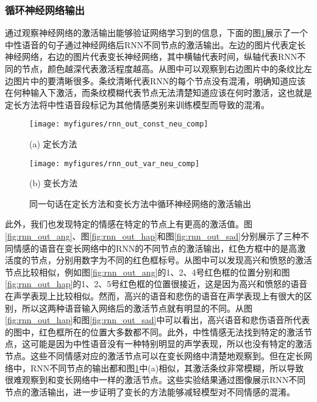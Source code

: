 \subsubsection{循环神经网络输出}
\label{sec:var_len_experiement_rnn}

通过观察神经网络的激活输出能够验证网络学习到的信息，下面的图\ref{fig:rnn_out_comp}展示了一个中性语音的句子通过神经网络后RNN不同节点的激活输出。左边的图片代表定长神经网络，右边的图片代表变长神经网络，其中横轴代表时间，纵轴代表RNN不同的节点，颜色越深代表激活程度越高。从图中可以观察到右边图片中的条纹比左边图片中的要清晰很多。条纹清晰代表RNN的每个节点没有混淆，明确知道应该在何种输入下激活，而条纹模糊代表节点无法清楚知道应该在何时激活，这也就是定长方法将中性语音段标记为其他情感类别来训练模型而导致的混淆。

\begin{figure}[h]
    \vspace{-0cm}  %
    \setlength{\belowcaptionskip}{0cm}   %
    \begin{minipage}{0.48\textwidth}
        \centering
        \texttt{[image: myfigures/rnn\_out\_const\_neu\_comp]}
        \centerline{(a) 定长方法}\medskip
    \end{minipage}\hfill
    \begin{minipage}{0.48\textwidth}
        \centering
        \texttt{[image: myfigures/rnn\_out\_var\_neu\_comp]}
        \centerline{(b) 变长方法}\medskip
    \end{minipage}
    \caption{同一句话在定长方法和变长方法中循环神经网络的激活输出}
    \label{fig:rnn_out_comp}
\end{figure}

此外，我们也发现特定的情感在特定的节点上有更高的激活值。图\ref{fig:rnn_out_ang}、图\ref{fig:rnn_out_hap}和图\ref{fig:rnn_out_sad}分别展示了三种不同情感的语音在变长网络中的RNN的不同节点的激活输出，红色方框中的是高激活度的节点，分别用数字为不同的红色框标号。从图中可以发现高兴和愤怒的激活节点比较相似，例如图\ref{fig:rnn_out_ang}的1、2、4号红色框的位置分别和图\ref{fig:rnn_out_hap}的1、2、5号红色框的位置很接近，这是因为高兴和愤怒的语音在声学表现上比较相似。然而，高兴的语音和悲伤的语音在声学表现上有很大的区别，所以这两种语音输入网络后的激活节点就有明显的不同。从图\ref{fig:rnn_out_hap}和图\ref{fig:rnn_out_sad}中可以看出，高兴语音和悲伤语音所代表的图中，红色框所在的位置大多数都不同。此外，中性情感无法找到特定的激活节点，这可能是因为中性语音没有一种特别明显的声学表现，所以也没有特定的激活节点。这些不同情感对应的激活节点可以在变长网络中清楚地观察到。但在定长网络中，RNN不同节点的输出都和图\ref{fig:rnn_out_comp}中(a)相似，其激活条纹非常模糊，所以导致很难观察到和变长网络中一样的激活节点。这些实验结果通过图像展示RNN不同节点的激活输出，进一步证明了变长的方法能够减轻模型对不同情感的混淆。

